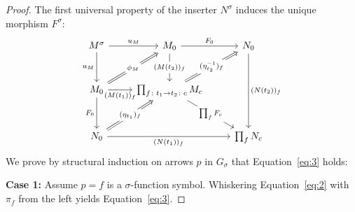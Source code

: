 \begin{proof}
   The first universal property of the inserter $N^\sigma$ induces the unique morphism $F^\sigma$:
   \[
   \begin{tikzcd}[row sep = 1 cm]
M^\sigma \arrow[d, "u_M"'] \arrow[r, "u_M"]                                                 & M_0 \arrow[r, "F_0"] \arrow[d, "(M(t_2))_f" description]                                                                              & N_0 \arrow[dd, "(N(t_2))_f"] \\
M_0 \arrow[d, "F_0"'] \arrow[r, "(M(t_1))_f"'] \arrow[ru, "\phi_M" description, Rightarrow] & \prod_{f\colon t_1\to t_2\colon c}M_c \arrow[rd, "\prod_f F_c" description] \arrow[ru, "(\eta_{t_2}^{-1})_f" description, Rightarrow] &                              \\
N_0 \arrow[rr, "(N(t_1))_f"'] \arrow[ru, "(\eta_{t_1})_f" description, Rightarrow]          &                                                                                                                                       & \prod_f N_c
\end{tikzcd}
   \]
   We prove by structural induction on arrows $p$ in $G_\sigma$ that Equation~\eqref{eq:3} holds:

       \noindent\textbf{Case 1:} Assume $p = f$ is a $\sigma$-function symbol. Whiskering Equation~\eqref{eq:2} with $\pi_f$ from the left yields Equation~\eqref{eq:3}.


\end{proof}
